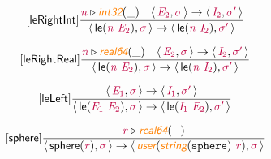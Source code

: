 \documentclass[10pt,leqno,fleqn]{article}
\newcommand{\artVariable}[1]{\mbox{\color{purple}\em #1\/}}
\newcommand{\artConstructor}[1]{\mbox{\sf #1}}
\newcommand{\artCaseInsensitiveLiteral}[1]{\mbox{\tt #1}}
\newcommand{\artSpecial}[1]{\mbox{\color{orange}\sf\em #1}}
\begin{document}
\begin{equation}
\tag*{[\artConstructor{\sf leRightInt}]}
\begin{split}\frac{ \artVariable{n}\triangleright \artSpecial{int32}(\_) \quad \langle\, \artVariable{E$_{2}$}, \artVariable{$\sigma$}\,\rangle \rightarrow \langle\, \artVariable{I$_{2}$}, \artVariable{$\sigma$\/$^\prime$}\,\rangle }{\langle\, \artConstructor{\sf le}(\artVariable{n}\ \artVariable{E$_{2}$}), \artVariable{$\sigma$}\,\rangle \rightarrow \langle\, \artConstructor{\sf le}(\artVariable{n}\ \artVariable{I$_{2}$}), \artVariable{$\sigma$\/$^\prime$}\,\rangle }
\end{split}
\end{equation}

\begin{equation}
\tag*{[\artConstructor{\sf leRightReal}]}
\begin{split}\frac{ \artVariable{n}\triangleright \artSpecial{real64}(\_) \quad \langle\, \artVariable{E$_{2}$}, \artVariable{$\sigma$}\,\rangle \rightarrow \langle\, \artVariable{I$_{2}$}, \artVariable{$\sigma$\/$^\prime$}\,\rangle }{\langle\, \artConstructor{\sf le}(\artVariable{n}\ \artVariable{E$_{2}$}), \artVariable{$\sigma$}\,\rangle \rightarrow \langle\, \artConstructor{\sf le}(\artVariable{n}\ \artVariable{I$_{2}$}), \artVariable{$\sigma$\/$^\prime$}\,\rangle }
\end{split}
\end{equation}

\begin{equation}
\tag*{[\artConstructor{\sf leLeft}]}
\begin{split}\frac{\langle\, \artVariable{E$_{1}$}, \artVariable{$\sigma$}\,\rangle \rightarrow \langle\, \artVariable{I$_{1}$}, \artVariable{$\sigma$\/$^\prime$}\,\rangle }{\langle\, \artConstructor{\sf le}(\artVariable{E$_{1}$}\ \artVariable{E$_{2}$}), \artVariable{$\sigma$}\,\rangle \rightarrow \langle\, \artConstructor{\sf le}(\artVariable{I$_{1}$}\ \artVariable{E$_{2}$}), \artVariable{$\sigma$\/$^\prime$}\,\rangle }
\end{split}
\end{equation}

\begin{equation}
\tag*{[\artConstructor{\sf sphere}]}
\begin{split}\frac{ \artVariable{r}\triangleright \artSpecial{real64}(\_) }{\langle\, \artConstructor{\sf sphere}(\artVariable{r}), \artVariable{$\sigma$}\,\rangle \rightarrow \langle\, \artSpecial{user}(\artSpecial{string}(\artCaseInsensitiveLiteral{sphere})\ \artVariable{r}), \artVariable{$\sigma$}\,\rangle }
\end{split}
\end{equation}
\end{document}
